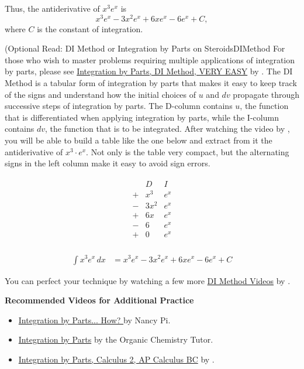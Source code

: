 Thus, the antiderivative of \( x^3 e^x \) is 
$$ x^3 e^x - 3x^2 e^x + 6x e^x - 6e^x + C,$$
where \( C \) is the constant of integration.
\Qed

\bigskip

\begin{methodColor}{(Optional Read: DI Method or Integration by Parts on Steroids}{DIMethod} 
For those who wish to master problems requiring multiple applications of integration by parts, please see \href{https://youtu.be/2I-_SV8cwsw}{Integration by Parts, DI Method, VERY EASY} by \bprp. The DI Method is a tabular form of integration by parts that makes it easy to keep track of the signs and understand how the initial choices of $u$ and $dv$ propagate through successive steps of integration by parts. The D-column contains $u$, the function that is differentiated when applying integration by parts, while the I-column contains $dv$, the function that is to be integrated. After watching the video by \bprp, you will be able to build a table like the one below and extract from it the antiderivative of $x^3 \cdot e^x$. Not only is the table very compact, but the alternating signs in the left column make it easy to avoid sign errors. 

\begin{align*}
\begin{array}{c|c|c}
 & D & I\\
\hline
+ & x^3 & e^x \\
- & 3x^2 & e^x \\
+ & 6x & e^x \\
- & 6 & e^x \\
+ & 0 & e^x \\
\end{array}
\end{align*}

\begin{align*}
\int x^3 e^x \, dx &= x^3 e^x - 3x^2 e^x + 6x e^x - 6 e^x + C
\end{align*}

You can perfect your technique by watching a few more \href{https://www.youtube.com/results?search_query=bprp+di+method}{DI Method Videos} by \bprp. 
\end{methodColor}

\bigskip
\textbf{Recommended Videos for Additional Practice}
\begin{itemize}
    \item \href{https://youtu.be/KKg88oSUv0o}{Integration by Parts... How? } by Nancy Pi.
    \item \href{https://youtu.be/sWSLLO3DS1I}{Integration by Parts} by the Organic Chemistry Tutor.    
    \item \href{https://youtu.be/lqmAC57BPaI}{Integration by Parts, Calculus 2, AP Calculus BC} by \bprp.
\end{itemize}

